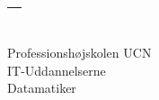 %
\begin{titlepage}
  \addtolength{\hoffset}{0.5\evensidemargin-0.5\oddsidemargin} %
  \noindent%
  \begin{tabular}{@{}p{\textwidth}@{}}
    \arrayrulecolor{ucnblue}
	\toprule[1.5pt]
    \vspace{0.2cm}
    \begin{center}
    \Huge{\textbf{
			\textcolor{ucnblue}{}%
    }}
    \end{center}
    \begin{center}
      \Large{
			\textcolor{ucnblue}{} %
      }
    \end{center}
    \vspace{0.2cm}\\
    \toprule[1.5pt]
  \end{tabular}
  \vspace{4 cm}
  \begin{center}
    {\large
    }
    \vspace{0.5cm}
    {\Large
    }
  \end{center}
  \vfill
  \begin{center}
  Professionshøjskolen UCN\\
  IT-Uddannelserne\\
  Datamatiker
  \end{center}
  \large
\end{titlepage}
\clearpage
